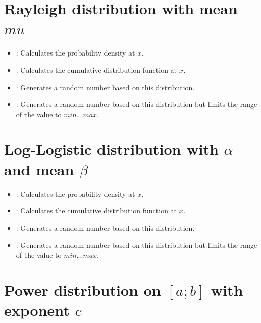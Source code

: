 \section{Rayleigh distribution with mean \texorpdfstring{$mu$}{mu}}

\begin{itemize}

\item
{}:
Calculates the probability density at $x$.

\item
{}:
Calculates the cumulative distribution function at $x$.

\item
{}:
Generates a random number based on this distribution.

\item
{}:
Generates a random number based on this distribution but limits the range of the value to $min\ldots max$.

\end{itemize}



\section{Log-Logistic distribution with \texorpdfstring{$\alpha$}{alpha} and mean \texorpdfstring{$\beta$}{beta}}

\begin{itemize}

\item
{}:
Calculates the probability density at $x$.

\item
{}:
Calculates the cumulative distribution function at $x$.

\item
{}:
Generates a random number based on this distribution.

\item
{}:
Generates a random number based on this distribution but limits the range of the value to $min\ldots max$.

\end{itemize}



\section{Power distribution on \texorpdfstring{$[a;b]$}{[a;b]} with exponent \texorpdfstring{$c$}{c}}

